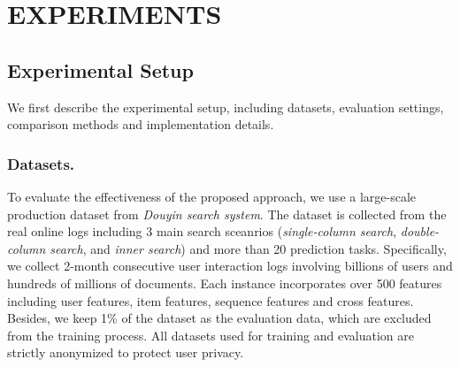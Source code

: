 \section{EXPERIMENTS}
\label{sec-exp}

\subsection{Experimental Setup}
We first describe the experimental setup, including datasets, evaluation settings, comparison methods and implementation details.

\subsubsection{Datasets.}
To evaluate the effectiveness of the proposed approach, we use a large-scale production dataset from \emph{Douyin search system}.
The dataset is collected from the real online logs including 3 main search sceanrios (\ie \emph{single-column search}, \emph{double-column search}, and \emph{inner search}) and more than 20 prediction tasks.
Specifically, we collect 2-month consecutive user interaction
logs involving billions of users and hundreds of millions of documents.
Each instance incorporates over 500 features including user features, item features, sequence features and cross features.
Besides, we keep 1\% of the dataset as the evaluation data, which are excluded from the training process.
All datasets used for training and evaluation are strictly anonymized to protect user privacy.

